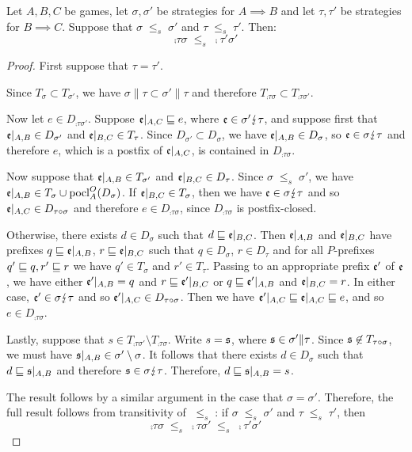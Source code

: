 \documentclass{entcs} \usepackage{prentcsmacro}
\newcommand{\stle}{{\;\le_s\;}}
\newcommand{\dv}{{\lightning}}
\DeclareMathOperator{\pocl}{pocl}
\newcommand{\0}{{\mathtt{0}}}
\begin{document}
\begin{proposition}
  \label{compositionMonotonicSO}
  Let $A,B,C$ be games, let $\sigma,\sigma'$ be strategies for $A\implies B$ and let $\tau,\tau'$ be strategies for $B\implies C$.  Suppose that $\sigma\stle\sigma'$ and $\tau\stle\tau'$.  Then:
  \[
    \comp\tau\sigma\stle\comp{\tau'}{\sigma'}
    \]
\end{proposition}
  \begin{proof}
    First suppose that $\tau=\tau'$.  

    Since $T_\sigma\subset T_{\sigma'}$, we have $\sigma\|\tau\subset\sigma'\|\tau$ and therefore $T_{\comp\tau\sigma}\subset T_{\comp{\tau}{\sigma'}}$.  

    Now let $e\in D_{\comp{\tau}{\sigma'}}$.  Suppose $\mathfrak e\vert_{A,C}\sqsubseteq e$, where $\e\in\sigma'\dv\tau$, and suppose first that $\mathfrak e\vert_{A,B}\in D_{\sigma'}$ and $\mathfrak e\vert_{B,C}\in T_{\tau}$.  Since $D_{\sigma'}\subset D_\sigma$, we have $\mathfrak e\vert_{A,B}\in D_\sigma$, so $\e\in\sigma\dv\tau$ and therefore $e$, which is a postfix of $\mathfrak e\vert_{A,C}$, is contained in $D_{\comp\tau\sigma}$.  
    
    Now suppose that $\mathfrak e\vert_{A,B}\in T_{\sigma'}$ and $\mathfrak e\vert_{B,C}\in D_{\tau}$.  Since $\sigma\stle\sigma'$, we have $\e\vert_{A,B}\in T_\sigma\cup \pocl_A^O(D_\sigma)$.  If $\mathfrak e\vert_{B,C}\in T_\sigma$, then we have $\e\in\sigma\dv\tau$ and so $\mathfrak e\vert_{A,C}\in D_{\tau \circ \sigma}$ and therefore $e\in D_{\comp\tau\sigma}$, since $D_{\comp\tau\sigma}$ is postfix-closed.  

    Otherwise, there exists $d\in D_\sigma$ such that $d\sqsubseteq\mathfrak e\vert_{B,C}$.  Then $\mathfrak e\vert_{A,B}$ and $\mathfrak e\vert_{B,C}$ have prefixes $q\sqsubseteq\mathfrak e\vert_{A,B}$, $r\sqsubseteq\mathfrak e\vert_{B,C}$ such that $q\in D_\sigma$, $r\in D_\tau$ and for all $P$-prefixes $q'\sqsubseteq q, r'\sqsubseteq r$ we have $q'\in T_\sigma$ and $r'\in T_\tau$.  Passing to an appropriate prefix $\mathfrak e'$ of $\mathfrak e$, we have either $\mathfrak e'\vert_{A,B}=q$ and $r\sqsubseteq\mathfrak e'\vert_{B,C}$ or $q\sqsubseteq\mathfrak e'\vert_{A,B}$ and $\mathfrak e\vert_{B,C}=r$.  In either case, $\e'\in \sigma\dv\tau$ and so $\mathfrak e'\vert_{A,C}\in D_{\tau \circ \sigma}$.  Then we have $\mathfrak e'\vert_{A,C}\sqsubseteq\mathfrak e\vert_{A,C}\sqsubseteq e$, and so $e\in D_{\comp\tau\sigma}$.  

    Lastly, suppose that $s\in T_{\comp{\tau}{\sigma'}}\setminus T_{\comp\tau\sigma}$.  Write $s=\mathfrak s$, where $\mathfrak s\in\sigma'\|\tau$.  Since $\mathfrak s\not\in T_{\tau \circ \sigma}$, we must have $\mathfrak s\vert_{A,B}\in\sigma'\setminus\sigma$.  It follows that there exists $d\in D_\sigma$ such that $d\sqsubseteq\mathfrak s\vert_{A,B}$ and therefore $\s\in\sigma\dv\tau$.  Therefore, $d\sqsubseteq\mathfrak s\vert_{A,B} = s$.

    The result follows by a similar argument in the case that $\sigma=\sigma'$.  Therefore, the full result follows from transitivity of $\stle$: if $\sigma\stle\sigma'$ and $\tau\stle\tau'$, then
    \[
      \comp\tau\sigma \stle \comp\tau{\sigma'} \stle \comp{\tau'}{\sigma'}
      \]
  \end{proof}
\end{document}
